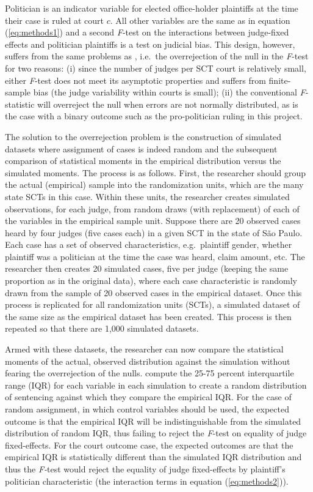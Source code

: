 \documentclass[11pt]{article}
\newcommand{\refp}[1]{(\ref{#1})}
\begin{document}
Politician is an indicator variable for elected office-holder plaintiffs at the time their case is ruled at court $c$. All other variables are the same as in equation \refp{eq:methods1} and a second \emph{F}-test on the interactions between judge-fixed effects and politician plaintiffs is a test on judicial bias. This design, however, suffers from the same problems as \citet{AbramsJudgesVaryTheir2012}, i.e.~the overrejection of the null in the \emph{F}-test for two reasons: (i) since the number of judges per SCT court is relatively small, either \emph{F}-test does not meet its asymptotic properties and suffers from finite-sample bias (the judge variability within courts is small); (ii) the conventional \emph{F}-statistic will overreject the null when errors are not normally distributed, as is the case with a binary outcome such as the pro-politician ruling in this project.

The solution to the overrejection problem is the construction of simulated datasets where assignment of cases is indeed random and the subsequent comparison of statistical moments in the empirical distribution versus the simulated moments. The process is as follows. First, the researcher should group the actual (empirical) sample into the randomization units, which are the many state SCTs in this case. Within these units, the researcher creates simulated observations, for each judge, from random draws (with replacement) of each of the variables in the empirical sample unit. Suppose there are 20 observed cases heard by four judges (five cases each) in a given SCT in the state of São Paulo. Each case has a set of observed characteristics, e.g.~plaintiff gender, whether plaintiff was a politician at the time the case was heard, claim amount, etc. The researcher then creates 20 simulated cases, five per judge (keeping the same proportion as in the original data), where each case characteristic is randomly drawn from the sample of 20 observed cases in the empirical dataset. Once this process is replicated for all randomization units (SCTs), a simulated dataset of the same size as the empirical dataset has been created. This process is then repeated so that there are 1,000 simulated datasets.

Armed with these datasets, the researcher can now compare the statistical moments of the actual, observed distribution against the simulation without fearing the overrejection of the nulls. \citet{AbramsJudgesVaryTheir2012} compute the 25-75 percent interquartile range (IQR) for each variable in each simulation to create a random distribution of sentencing against which they compare the empirical IQR. For the case of random assignment, in which control variables should be used, the expected outcome is that the empirical IQR will be indistinguishable from the simulated distribution of random IQR, thus failing to reject the \emph{F}-test on equality of judge fixed-effects. For the court outcome case, the expected outcomes are that the empirical IQR is statistically different than the simulated IQR distribution and thus the \emph{F-}test would reject the equality of judge fixed-effects by plaintiff's politician characteristic (the interaction terms in equation \refp{eq:methods2}).
\end{document}
